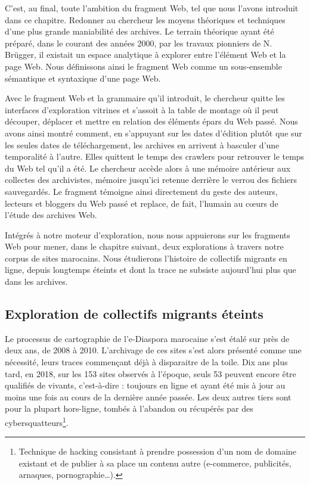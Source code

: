 \documentclass[symmetric,justified,marginals=raggedouter]{tufte-book}
\begin{document}
C'est, au final, toute l'ambition du fragment Web, tel que nous l'avons introduit dans ce chapitre. Redonner au chercheur les moyens théoriques et techniques d'une plus grande maniabilité des archives. Le terrain théorique ayant été préparé, dans le courant des années 2000, par les travaux pionniers de N. Brügger, il existait un espace analytique à explorer entre l'élément Web et la page Web. Nous définissons ainsi le fragment Web comme un sous-ensemble sémantique et syntaxique d'une page Web.

Avec le fragment Web et la grammaire qu'il introduit, le chercheur quitte les interfaces d'exploration vitrines et s'assoit à la table de montage où il peut découper, déplacer et mettre en relation des éléments épars du Web passé. Nous avons ainsi montré comment, en s'appuyant sur les dates d'édition plutôt que sur les seules dates de téléchargement, les archives en arrivent à basculer d'une temporalité à l'autre. Elles quittent le temps des crawlers pour retrouver le temps du Web tel qu'il a été. Le chercheur accède alors à une mémoire antérieur aux collectes des archivistes, mémoire jusqu'ici retenue derrière le verrou des fichiers sauvegardés. Le fragment témoigne ainsi directement du geste des auteurs, lecteurs et bloggers du Web passé et replace, de fait, l'humain au cœurs de l'étude des archives Web.

Intégrés à notre moteur d'exploration, nous nous appuierons sur les fragments Web pour mener, dans le chapitre suivant, deux explorations à travers notre corpus de sites marocains. Nous étudierons l'histoire de collectifs migrants en ligne, depuis longtemps éteints et dont la trace ne subsiste aujourd'hui plus que dans les archives.  



\cleardoublepage
\begin{minipage}[t,leftmargin=5em]{1.5\linewidth}%
\begin{adjustwidth}{-0.5cm}{}
\chapter{Exploration de collectifs migrants éteints} 
\label{chap:6}
\end{adjustwidth}
\end{minipage}
\hfill

\noindent Le processus de cartographie de l'e-Diaspora marocaine s'est étalé sur près de deux ans, de 2008 à 2010. L'archivage de ces sites s'est alors présenté comme une nécessité, leurs traces commençant déjà à disparaitre de la toile. Dix ans plus tard, en 2018, sur les 153 sites observés à l'époque, seuls 53 peuvent encore être qualifiés de vivants, c'est-à-dire : toujours en ligne et ayant été mis à jour au moins une fois au cours de la dernière année passée. Les deux autres tiers sont pour la plupart hors-ligne, tombés à l'abandon ou récupérés par des cybersquatteurs\footnote{\RaggedOuter Technique de hacking consistant à prendre possession d'un nom de domaine existant et de publier à sa place un contenu autre (e-commerce, publicités, arnaques, pornographie\ldots{}).}.      
\end{document}
